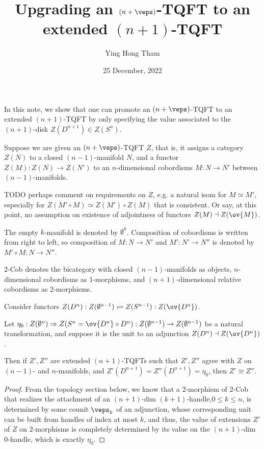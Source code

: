 \documentclass[12pt]{article}
\newcommand{\disk}[1]{{D^{#1}}}
\newcommand{\sphr}[1]{{S^{#1}}}
\newcommand{\empt}[1]{{\emptyset^{#1}}}
\begin{document}
\title{Upgrading an $(n+\veps)$-TQFT to an extended $(n+1)$-TQFT}
\author{Ying Hong Tham}
\date{25 December, 2022}
\maketitle


In this note, we show that one can promote an
$(n+\veps)$-TQFT to an extended $(n+1)$-TQFT
by only specifying the value associated to
the $(n+1)$-disk $Z(\disk{n+1}) \in Z(S^n)$.

Suppose we are given an $(n+\veps)$-TQFT $Z$,
that is,
it assigns a category $Z(N)$ to a closed $(n-1)$-manifold $N$,
and a functor $Z(M):Z(N) \to Z(N')$ to an $n$-dimensional
cobordisms $M:N\to N'$ between $(n-1)$-manifolds.

TODO perhaps comment on requirements on $Z$,
e.g. a natural isom for $M \simeq M'$,
especially for $Z(M' \circ M) \simeq Z(M') \circ Z(M)$
that is consistent.
Or say, at this point, no assumption on existence of
adjointness of functors $Z(M) \dashv Z(\ov{M})$.

The empty $k$-manifold is denoted by $\empt{k}$.
Composition of cobordisms is written from right to left,
so composition of $M: N \to N'$ and $M' : N' \to N''$
is denoted by $M' \circ M: N \to N''$.

2-Cob denotes the bicategory with
closed $(n-1)$-manifolds as objects,
$n$-dimensional cobordisms as 1-morphisms,
and $(n+1)$-dimensional relative cobordisms as 2-morphisms.

\begin{proposition}
\label{p:extend-uniqueness}
Consider functors
$Z(\disk{n}) : Z(\empt{n-1}) \rightleftharpoons
	Z(\sphr{n-1}) : Z(\ov{\disk{n}})$.

Let $\eta_0: Z(\empt{n}) \Rightarrow
	Z(\sphr{n} = \ov{\disk{n}} \circ \disk{n})
	: Z(\empt{n-1}) \to Z(\empt{n-1})$
be a natural transformation,
and suppose it is the unit to an adjunction
$Z(\disk{n}) \dashv Z(\ov{\disk{n}})$.

Then if $Z',Z''$ are extended $(n+1)$-TQFTs
such that $Z',Z''$ agree with $Z$ on $(n-1)$- and $n$-manifolds,
and $Z'(\disk{n+1}) = Z''(\disk{n+1}) = \eta_0$,
then $Z' \cong Z''$.
\end{proposition}


\begin{proof}
From the topology section below,
we know that a 2-morphism of 2-Cob that realizes
the attachment of an $(n+1)$-dim $(k+1)$-handle,$0 \leq k \leq n$,
is determined by some counit $\veps_k$
of an adjunction,
whose corresponding unit can be built from handles
of index at most $k$,
and thus, the value of extensions $Z'$ of $Z$ on 2-morphisms
is completely determined by its value on the
$(n+1)$-dim 0-handle, which is exactly $\eta_0$.
\end{proof}
\end{document}
